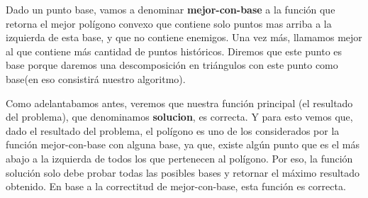 \par{Dado un punto base, vamos a denominar \textbf{mejor-con-base} a la función que retorna el mejor polígono convexo que contiene solo puntos mas arriba a la izquierda de esta base, y que no contiene enemigos. Una vez más, llamamos mejor al que contiene más cantidad de puntos históricos. Diremos que este punto es base porque daremos una descomposición en triángulos con este punto como base(en eso consistirá nuestro algoritmo).}
\par{Como adelantabamos antes, veremos que nuestra función principal (el resultado del problema), que denominamos \textbf{solucion}, es correcta. Y para esto vemos que, dado el resultado del problema, el polígono es uno de los considerados por la función mejor-con-base con alguna base, ya que, existe algún punto que es el más abajo a la izquierda de todos los que pertenecen al polígono. Por eso, la función solución solo debe probar todas las posibles bases y retornar el máximo resultado obtenido. En base a la correctitud de mejor-con-base, esta función es correcta.}